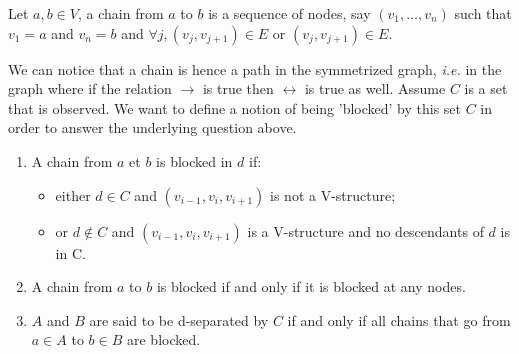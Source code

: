 \documentclass[12pt]{report}
\begin{document}
\begin{definition}
Let $a,b\in V$, a chain from $a$ to $b$ is a sequence of nodes, say $(v_1, \dots, v_n)$ such that $v_1 = a$ and $v_n = b$ and $\forall j, (v_j, v_{j+1}) \in E$ or $(v_j, v_{j+1}) \in E$.
\end{definition}

We can notice that a chain is hence a path in the symmetrized graph, \emph{i.e.} in the graph where if the relation $\rightarrow$ is true then $\leftrightarrow$ is true as well. Assume $C$ is a set that is observed. We want to define a notion of being 'blocked' by this set $C$ in order to answer the underlying question above. 

\begin{definition}
\begin{enumerate}
\item A chain from $a$ et $b$ is blocked in $d$ if:
\begin{itemize}
\item either $d\in C$ and $(v_{i-1}, v_i, v_{i+1})$ is not a V-structure;
\item or $d\notin C$ and $(v_{i-1}, v_i, v_{i+1})$ is a V-structure and no descendants of $d$ is in C.
\end{itemize}

\item A chain from $a$ to $b$ is blocked if and only if it is blocked at any nodes.

\item $A$ and $B$ are said to be d-separated by $C$ if and only if all chains that go from $a\in A$ to $b\in B$ are blocked.
\end{enumerate}
\end{definition}
\end{document}
